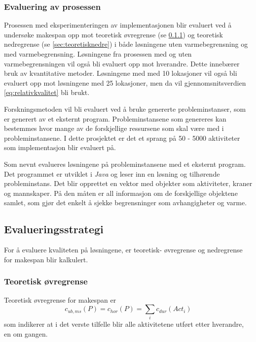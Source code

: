 \subsubsection{Evaluering av prosessen}
Prosessen med eksperimenteringen av implementasjonen blir evaluert ved å undersøke makespan opp mot teoretisk øvregrense (se \ref{sec:teoretiskovre}) og teoretisk nedregrense (se \ref{sec:teoretisknedre}) i både løsningene uten varmebegrensning og med varmebegrensning. Løsningene fra prosessen med og uten varmebegrensningen vil også bli evaluert opp mot hverandre. Dette innebærer bruk av kvantitative metoder. Løsningene med med 10 lokasjoner vil også bli evaluert opp mot løsningene med 25 lokasjoner, men da vil gjennomsnitsverdien \ref{eq:relativkvalitet} bli brukt.

Forskningsmetoden vil bli evaluert ved å bruke genererte probleminstanser, som er generert av et eksternt program. Probleminstansene som genereres kan bestemmes hvor mange av de forskjellige ressursene som skal være med i probleminstansene. I dette prosjektet er det et sprang på 50 - 5000 aktiviteter som implementasjon blir evaluert på.

Som nevnt evalueres løsningene på probleminstansene med et eksternt program. Det programmet er utviklet i \textit{Java} og leser inn en løsning og tilhørende probleminstans. Det blir opprettet en vektor med objekter som aktiviteter, kraner og mannskaper. På den måten er all informasjon om de forskjellige objektene samlet, som gjør det enkelt å sjekke begrensninger som avhangigheter og varme.

\subsection{Evalueringsstrategi}
\label{sec:strategy}
For å evaluere kvaliteten på løsningene, er teoretisk- øvregrense og nedregrense for makespan blir kalkulert.

\subsubsection{Teoretisk øvregrense}
\label{sec:teoretiskovre}
Teoretisk øvregrense for makespan er
\begin{equation}
c_{ub,ms}(P) = c_{hor}(P) = \sum_{i} c_{dur}(Act_{i})
\end{equation}
som indikerer at i det verste tilfelle blir alle aktivitetene utført etter hverandre, en om gangen.

